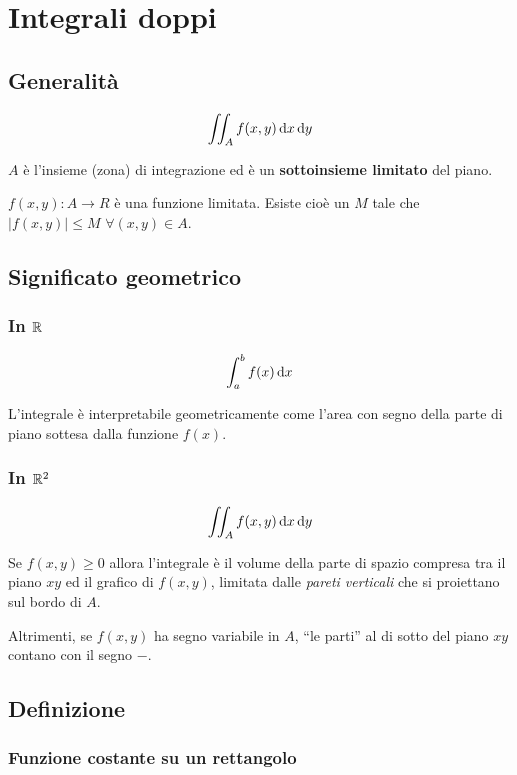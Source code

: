\chapter{Integrali doppi}

\section{Generalità}

$$\iint_A f(x,y) \mathop{}\!\mathrm{d} x \mathop{}\!\mathrm{d} y$$

$A$ è l'insieme (zona) di integrazione ed è un \textbf{sottoinsieme limitato} del piano.

$f(x,y) : A \to R$ è una funzione limitata. Esiste cioè un $M$ tale che $|f(x,y)| \leq M$ $\forall (x,y) \in A$.

\section{Significato geometrico}

\subsection{In $\mathbb{R}$}

$$\int_a^b f(x) \mathop{}\!\mathrm{d} x$$

L'integrale è interpretabile geometricamente come l'area con segno della parte di piano sottesa dalla funzione $f(x)$.

\subsection{In $\mathbb{R}^2$}

$$\iint_A f(x,y) \mathop{}\!\mathrm{d} x \mathop{}\!\mathrm{d} y$$

Se $f(x,y) \ge 0$ allora l'integrale è il volume della parte di spazio compresa tra il piano $xy$ ed il grafico di $f(x,y)$, limitata dalle \textit{pareti verticali} che si proiettano sul bordo di $A$.

Altrimenti, se $f(x,y)$ ha segno variabile in $A$, ``le parti'' al di sotto del piano $xy$ contano con il segno $-$.

\section{Definizione}

\subsection{Funzione costante su un rettangolo}

